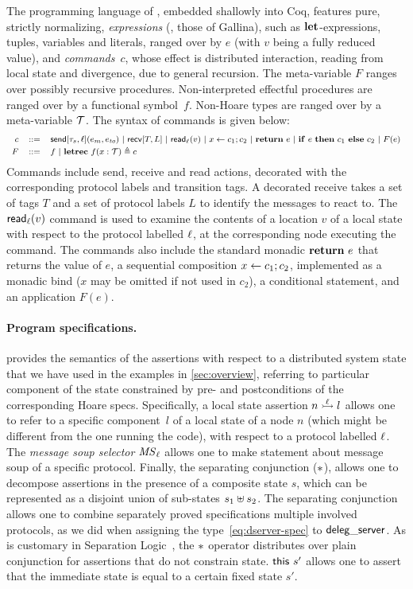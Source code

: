The programming language of \disel, embedded shallowly into Coq,
features pure, strictly normalizing, \emph{expressions} (\ie, those of
Gallina), such as $\mathsf{{\bf let}}{}$-expressions, tuples, variables and literals,
ranged over by $e$ (with $v$ being a fully reduced value), and
\emph{commands}~$c$, whose effect is distributed interaction, reading
from local state and divergence, due to general recursion. The
meta-variable $F$ ranges over possibly recursive
procedures. Non-interpreted effectful procedures are ranged over by a
functional symbol~$f$. Non-Hoare types are ranged over by a
meta-variable $\mathcal{T}$.
%
The syntax of \disel commands is given below:
%
\[
{\footnotesize
\begin{array}{rcl}
  c & ::= &  \mathsf{send}[\tau_s, \ell](e_m, e_{\mathit{to}}) ~|~ \mathsf{recv}[T, L] ~|~  \mathsf{{read}}{}_{\ell}(v)  ~|~  x \leftarrow c_1; c_2 ~|~ \mathsf{{\bf return}}{}~e ~|~
            \mathsf{{\bf if}}{}~e~\mathsf{{\bf then}}{}~c_1~\mathsf{{\bf else}}{}~c_2 ~|~
            F(e)
  \\[2pt]
  F & ::= & f ~|~ \mathsf{{\bf letrec}}{}~f (x : \mathcal{T}) \triangleq c
\end{array}
}
\]
%
Commands include send, receive and read actions, decorated with the
corresponding protocol labels and transition tags. A decorated receive
takes a set of tags $T$ and a set of protocol labels $L$ to identify
the messages to react to. The $\mathsf{{read}}{}_{\ell}(v)$ command is used to
examine the contents of a location $v$ of a local state with respect
to the protocol labelled $\ell$, at the corresponding node executing
the command.
%
The commands also include the standard monadic $\mathsf{{\bf return}}{}~e$ that returns
the value of $e$, a sequential composition $x \leftarrow c_1; c_2$,
implemented as a monadic bind ($x$ may be omitted if not used in
$c_2$), a conditional statement, and an application $F(e)$.

\paragraph{Program specifications.~}

 provides the semantics of the assertions with
respect to a distributed system state that we have used in the
examples in \cref{sec:overview}, referring to particular
component of the state constrained by pre- and postconditions of the
corresponding Hoare specs.
%
Specifically, a local state assertion $n \ppts{\lab} l$ allows one to
refer to a specific component~$l$ of a local state of a node $n$
(which might be different from the one running the code), with respect
to a protocol labelled $\ell$. The \emph{message soup selector}
$\mathit{MS}_{\ell}$ allows one to make statement about message soup of a
specific protocol. Finally, the separating conjunction ($\ast$),
allows one to decompose assertions in the presence of a composite state
$s$, which can be represented as a disjoint union of sub-states
$s_1 \uplus s_2$.
%
The separating conjunction allows one to combine separately proved
specifications \wrt multiple involved protocols, as we did when
assigning the type~\eqref{eq:dserver-spec} to $\mathsf{deleg\_server}$.
%
As is customary in Separation Logic~\cite{Reynolds:LICS02}, the
$\ast$ operator distributes over plain conjunction for assertions
that do not constrain state.
%
$\mathsf{this}~{s'}$ allows one to assert that the immediate state is equal
to a certain fixed state $s'$.


